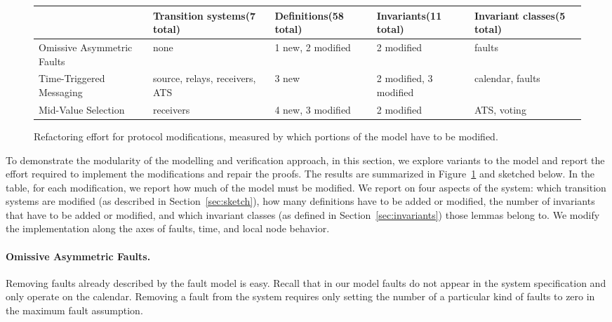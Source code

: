 \documentclass{llncs/llncs}
\begin{document}
{\begin{figure}
  \centering
  \begin{tabular}{|p{3cm}|p{2cm}|p{2cm}|p{2cm}|p{2cm}|}
  \hline
                                  & Transition systems\linebreak (7 total)  &Definitions\linebreak (58 total) & Invariants\linebreak (11 total) & Invariant classes\linebreak (5 total) \\
  \hline \hline
  Omissive Asymmetric Faults       & none      & 1 new, 2 modified & 2 modified & faults             \\
  \hline
  Time-Triggered Messaging        & source, relays, receivers, ATS & 3 new & 2 modified, 3 modified & calendar, faults \\
  \hline
  Mid-Value Selection & receivers & 4 new, 3 modified & 2 modified & ATS, voting \\
  \hline
  \end{tabular}
  \caption{Refactoring effort for protocol modifications, measured by which portions of the model have to be modified.}
  \label{fig:effort}
\end{figure}

To demonstrate the modularity of the modelling and verification approach, in this section, we explore variants to the model and report the effort required to implement the modifications and repair the proofs. The results are summarized in Figure~\ref{fig:effort} and sketched below. In the table, for each modification, we report how much of the model must be modified. We report on four aspects of the system: which transition systems are modified (as described in Section~\ref{sec:sketch}), how many definitions have to be added or modified, the number of invariants that have to be added or modified, and which invariant classes (as defined in Section~\ref{sec:invariants}) those lemmas belong to. We modify the implementation along the axes of faults, time, and local node behavior.

\paragraph{Omissive Asymmetric Faults.}
Removing faults already described by the fault model is easy. Recall that in our model faults do not appear in the system specification and only operate on the calendar. Removing a fault from the system requires only setting the number of a particular kind of faults to zero in the maximum fault assumption.

}
\end{document}
